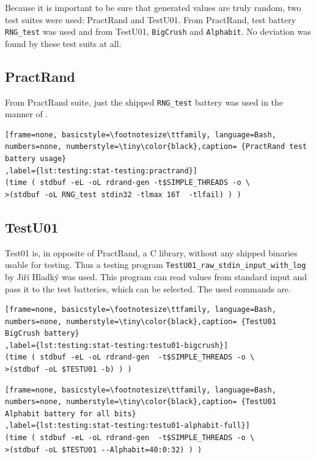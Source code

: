 Because it is important to be sure that generated values are truly random, two test suites were used: PractRand and TestU01. From PractRand, test battery {\tt RNG\_test} was used and from TestU01, {\tt BigCrush} and {\tt Alphabit}. No deviation was found by these test suits at all.

\subsection{PractRand}
From PractRand suite, just the shipped {\tt RNG\_test} battery was used in the manner of .


\begin{lstlisting}[frame=none, basicstyle=\footnotesize\ttfamily, language=Bash, numbers=none, numberstyle=\tiny\color{black},caption= {PractRand test battery usage}
,label={lst:testing:stat-testing:practrand}]
(time ( stdbuf -eL -oL rdrand-gen -t$SIMPLE_THREADS -o \
>(stdbuf -oL RNG_test stdin32 -tlmax 16T  -tlfail) ) )
\end{lstlisting}

\subsection{TestU01}
Test01 is, in opposite of PractRand, a C library, without any shipped binaries usable for testing. Thus a testing program {\tt TestU01\_raw\_stdin\_input\_with\_log} by Jiří Hladký\cite{CSPRNG} was used. This program can read values from standard input and pass it to the test batteries, which can be selected. The used commands are.

\begin{lstlisting}[frame=none, basicstyle=\footnotesize\ttfamily, language=Bash, numbers=none, numberstyle=\tiny\color{black},caption= {TestU01 BigCrush battery}
,label={lst:testing:stat-testing:testu01-bigcrush}]
(time ( stdbuf -eL -oL rdrand-gen  -t$SIMPLE_THREADS -o \
>(stdbuf -oL $TESTU01 -b) ) )
\end{lstlisting}

\begin{lstlisting}[frame=none, basicstyle=\footnotesize\ttfamily, language=Bash, numbers=none, numberstyle=\tiny\color{black},caption= {TestU01 Alphabit battery for all bits}
,label={lst:testing:stat-testing:testu01-alphabit-full}]
(time ( stdbuf -eL -oL rdrand-gen  -t$SIMPLE_THREADS -o \
>(stdbuf -oL $TESTU01 --Alphabit=40:0:32) ) ) 
\end{lstlisting}

